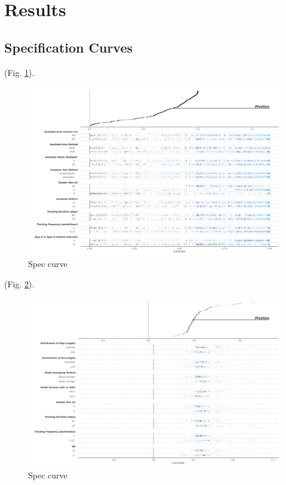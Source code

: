 \documentclass[10pt,a4paper]{article}
\begin{document}
\hypertarget{results}{%
\section{Results}\label{results}}

\hypertarget{specification-curves}{%
\subsection{Specification Curves}\label{specification-curves}}

(Fig. \ref{fig:specCurveArea}).

\begin{figure}
\includegraphics[width=1\linewidth]{../figures/area_specCurve} \caption{Spec curve}\label{fig:specCurveArea}
\end{figure}

(Fig. \ref{fig:specCurveSSF}).

\begin{figure}
\includegraphics[width=1\linewidth]{../figures/ssf_specCurve} \caption{Spec curve}\label{fig:specCurveSSF}
\end{figure}
\end{document}
